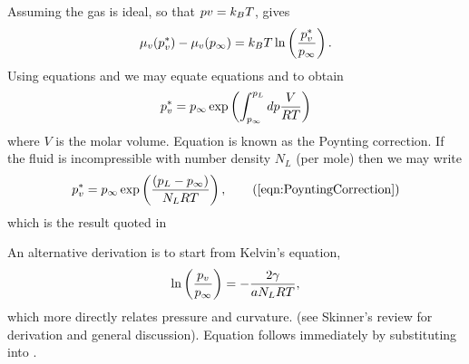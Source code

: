 Assuming the gas is ideal, so that $ p v = k_B T$,  gives
\begin{align}
  \mu_v(p_v^\ast) - \mu_v(p_{\infty}) = k_B T \ln \left( \frac{p_v^\ast}{p_\infty} \right).
\end{align}
Using equations  and  we may
equate equations  and  to obtain
\begin{align}
  p_v^\ast = p_\infty \exp \left( \int_{p_\infty}^{p_L} dp\frac{V}{RT}   \right)\label{eqn:PoyntingCorrectionFormal}
\end{align}
where $V$ is the molar volume.
Equation  is known as the Poynting correction.
If the fluid is incompressible with number density $N_L$  (per mole) then we may write
\begin{align}
  p_v^\ast = p_\infty \exp \lr{ \frac{\lr{p_L -p_\infty} }{N_L RT}  },\tag{\ref{eqn:PoyntingCorrection}}
\end{align}
which is the result quoted in 

An alternative derivation is to start  from Kelvin's equation,
\begin{align}
\ln\left( \frac{p_v}{p_\infty} \right) = - \frac{2\gamma }{a N_L RT}, \label{eqn:KelvinRelation}
\end{align}
which more directly relates pressure and curvature. (see Skinner's review\cite{Skinner1972} for derivation and general discussion).
Equation  follows immediately by substituting   into .






